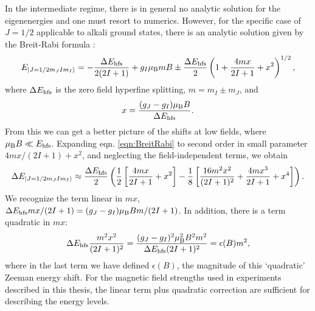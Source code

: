 In the intermediate regime, there is in general no analytic solution for the eigenenergies and one must resort to numerics. However, for the specific case of $J=1/2$ applicable to alkali ground states, there is an analytic solution given by the Breit-Rabi formula \cite{BreitRabi}:
\begin{equation}
E_{\mathinner{|{J=1/2 m_J I m_I}\rangle}} = - \frac{\Delta E_{\rm hfs}}{2(2I+1)}+g_I \mu_{\rm B} m B \pm \frac{\Delta E_{\rm hfs}}{2}\left(1+\frac{4mx}{2I+1}+x^2\right)^{1/2},
\label{eqn:BreitRabi}
\end{equation}
where $\Delta E_{\rm hfs}$ is the zero field hyperfine splitting, $m=m_I\pm m_J$, and
\begin{equation}
x=\frac{(g_J - g_I)\mu_{\rm B} B}{\Delta E_{\rm hfs}}.
\end{equation}
From this we can get a better picture of the shifts at low fields, where $\mu_{\rm B} B\ll E_{\rm hfs}$. Expanding eqn. \ref{eqn:BreitRabi} to second order in small parameter $4mx/(2I+1)+x^2$, and neglecting the field-independent terms, we obtain
\begin{equation}
\Delta E_{\mathinner{|{J=1/2 m_J I m_I}\rangle}}\approx \frac{\Delta E_{\rm hfs}}{2}\left(\frac{1}{2}\left[\frac{4mx}{2I+1}+x^2\right]-\frac{1}{8}\left[\frac{16m^2 x^2}{(2I+1)^2} +\frac{4mx^3}{2I+1}+x^4\right]\right).
\end{equation}
We recognize the term linear in $mx$,  $\Delta E_{\rm hfs} mx/(2I+1) = (g_J-g_I)\mu_{\rm B} B m/(2I+1)$. In addition, there is a term quadratic in $mx$:
\begin{equation}
\Delta E_{\rm hfs} \frac{m^2x^2}{(2I+1)^2} = \frac{(g_J-g_I)^2 \mu_{\rm B}^2 B^2 m^2}{\Delta E_{\rm hfs} (2I+1)^2} = \epsilon(B) m^2,
\end{equation}
where in the last term we have defined $\epsilon(B)$, the magnitude of this \lq{quadratic}\rq{} Zeeman energy shift. For the magnetic field strengths used in experiments described in this thesis, the linear term plus quadratic correction are sufficient for describing the energy levels.
%
%	

